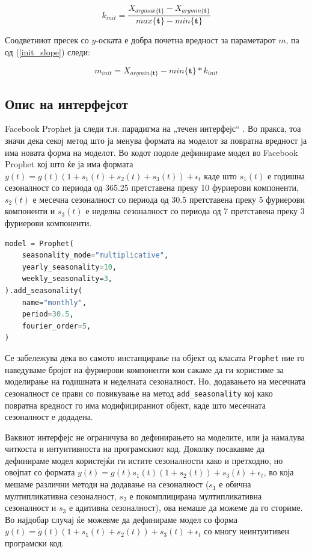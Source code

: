 \documentclass[12pt]{article}
\numberwithin{equation}{section}
\begin{document}
\begin{equation}\label{init_slope}
    k_{init} = \frac{X_{argmax\{\boldsymbol{t}\}} - X_{argmin\{\boldsymbol{t}\}}}{max\{\boldsymbol{t}\}-min\{\boldsymbol{t}\}}
\end{equation}

Соодветниот пресек со \(y\)-оската е добра почетна вредност за параметарот \(m\), па од (\ref{init_slope}) следи:

\begin{equation}\label{init_intercept}
    m_{init} = X_{argmin\{\boldsymbol{t}\}}-min\{\boldsymbol{t}\}*k_{init}
\end{equation}

\subsection{Опис на интерфејсот} \label{prophet_api}

Facebook Prophet ја следи т.н. парадигма на „течен интерфејс“ \cite{fowler2005fluent}. Во пракса, тоа значи дека секој метод што ја менува формата на моделот за повратна вредност ја има новата форма на моделот. Во кодот подоле дефинираме модел во Facebook Prophet кој што ќе ја има формата \(y(t) = g(t)(1 + s_1(t) + s_2(t) + s_3(t)) + \epsilon_t\) каде што \(s_1(t)\) е годишна сезоналност со периода од 365.25 претставена преку 10 фуриерови компоненти, \(s_2(t)\) е месечна сезоналност со периода од 30.5 претставена преку 5 фуриерови компоненти и \(s_3(t)\) е неделна сезоналност со периода од 7 претставена преку 3 фуриерови компоненти.

\begin{lstlisting}[language=Python,caption=Дефинирање на Facebook Prophet модел]
model = Prophet(
    seasonality_mode="multiplicative",
    yearly_seasonality=10,
    weekly_seasonality=3,
).add_seasonality(
    name="monthly",
    period=30.5,
    fourier_order=5,
)
\end{lstlisting}

Се забележува дека во самото инстанцирање на објект од класата \verb|Prophet| ние го наведуваме бројот на фуриерови компоненти кои сакаме да ги користиме за моделирање на годишната и неделната сезоналност. Но, додавањето на месечната сезоналност се прави со повикување на метод \verb|add_seasonality| кој како повратна вредност го има модифицираниот објект, каде што месечната сезоналност е додадена.

Ваквиот интерфејс не ограничува во дефинирањето на моделите, или ја намалува читкоста и интуитивноста на програмскиот код. Доколку посакавме да дефинираме модел користејќи ги истите сезоналности како и претходно, но овојпат со формата \(y(t)=g(t)s_1(t)(1 + s_2(t)) + s_3(t) + \epsilon_t\), во која мешаме различни методи на додавање на сезоналност (\(s_1\) е обична мултипликативна сезоналност, \(s_2\) е покомплицирана мултипликативна сезоналност и \(s_3\) е адитивна сезоналност), ова немаше да можеме да го сториме. Во најдобар случај ќе можевме да дефинираме модел со форма \(y(t)=g(t)(1 + s_1(t) + s_2(t)) + s_3(t) + \epsilon_t\) со многу неинтуитивен програмски код.
\end{document}
